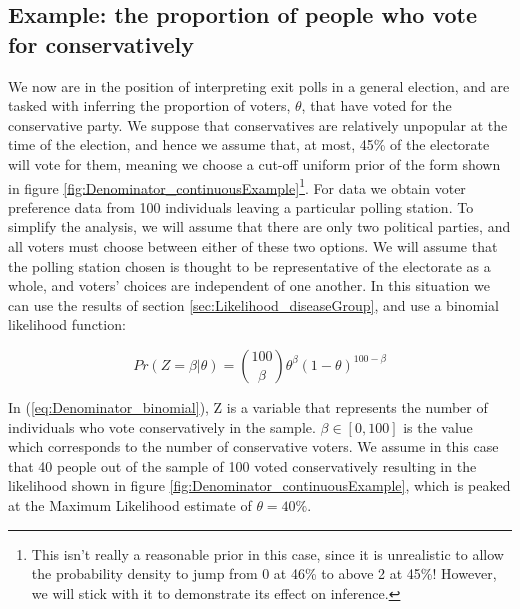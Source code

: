 \documentclass[11pt,fullpage]{book}
\begin{document}
\subsection{Example: the proportion of people who vote for conservatively}\label{sec:Denominator_continuousExample}
We now are in the position of interpreting exit polls in a general election, and are tasked with inferring the proportion of voters, $\theta$, that have voted for the conservative party. We suppose that conservatives are relatively unpopular at the time of the election, and hence we assume that, at most, 45\% of the electorate will vote for them, meaning we choose a cut-off uniform prior of the form shown in figure \ref{fig:Denominator_continuousExample}\footnote{This isn't really a reasonable prior in this case, since it is unrealistic to allow the probability density to jump from 0 at 46\% to above 2 at 45\%! However, we will stick with it to demonstrate its effect on inference.}. For data we obtain voter preference data from 100 individuals leaving a particular polling station. To simplify the analysis, we will assume that there are only two political parties, and all voters must choose between either of these two options. We will assume that the polling station chosen is thought to be representative of the electorate as a whole, and voters' choices are independent of one another. In this situation we can use the results of section \ref{sec:Likelihood_diseaseGroup}, and use a binomial likelihood function:

\begin{equation}\label{eq:Denominator_binomial}
Pr(Z=\beta|\theta) = {100 \choose \beta} \theta^\beta (1-\theta)^{100-\beta}
\end{equation}

In (\ref{eq:Denominator_binomial}), Z is a variable that represents the number of individuals who vote conservatively in the sample. $\beta\in[0,100]$ is the value which corresponds to the number of conservative voters. We assume in this case that 40 people out of the sample of 100 voted conservatively resulting in the likelihood shown in figure \ref{fig:Denominator_continuousExample}, which is peaked at the Maximum Likelihood estimate of $\theta=40\%$.
\end{document}
